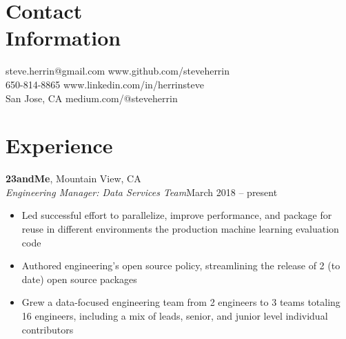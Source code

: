 \documentclass[margin,line]{resume}
\begin{document}
\begin{resume}

    \section{\mysidestyle Contact\\Information}

    steve.herrin@gmail.com		\hfill www.github.com/steveherrin		\vspace{0mm}\\\vspace{0mm}%
    650-814-8865				\hfill www.linkedin.com/in/herrinsteve		\vspace{0mm}\\\vspace{-4.5mm}%
    San Jose, CA    				\hfill medium.com/@steveherrin		\vspace{0mm}\\\vspace{0mm}%

    \section{\mysidestyle Experience}

    \textbf{23andMe}, Mountain View, CA \hfill\vspace{1mm}\\\vspace{1mm}%
    \textsl{Engineering Manager: Data Services Team}\hfill March 2018 -- present\vspace{1mm}\\\vspace{-3mm}%
    \begin{itemize}
    \item Led successful effort to parallelize, improve performance, and package for reuse in different environments the production machine learning evaluation code
    \item Authored engineering's open source policy, streamlining the release of 2 (to date) open source packages
    \item Grew a data-focused engineering team from 2 engineers to 3 teams totaling 16 engineers, including a mix of leads, senior, and junior level individual contributors
    \end{itemize}


\end{resume}
\end{document}
